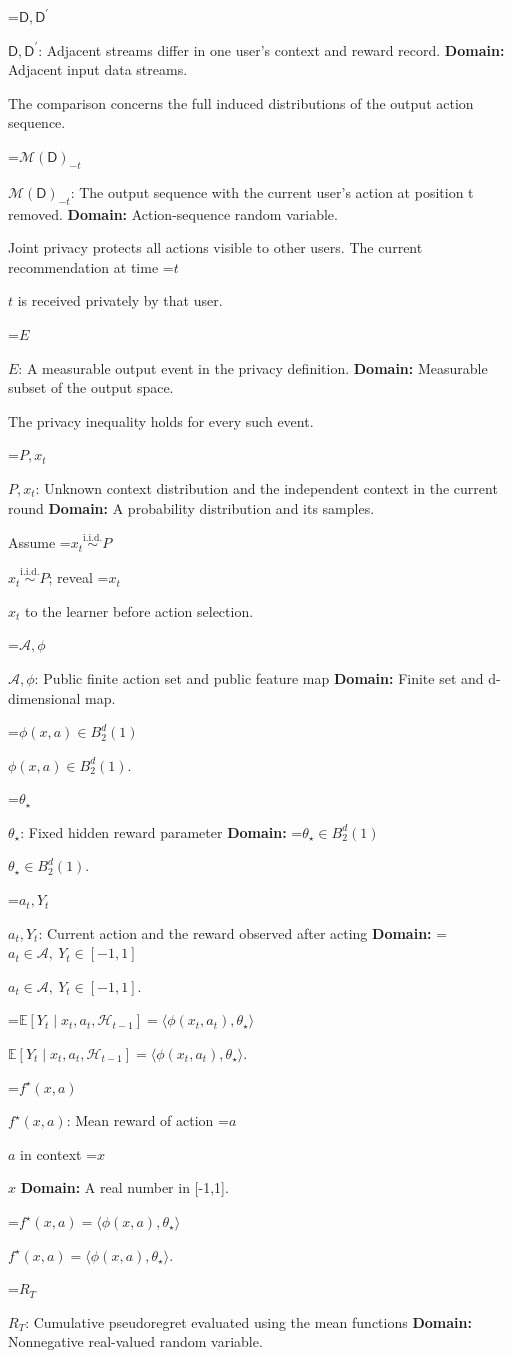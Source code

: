 \documentclass[10pt,a4paper]{article}
\newcommand{\AtlasMath}[1]{\par\begingroup\centering\setbox0=\hbox{$\displaystyle #1$}\ifdim\wd0>1.4\linewidth\typeout{ATLAS WIDE FORMULA: \the\wd0}\fi\ifdim\wd0>\linewidth\resizebox{\linewidth}{!}{\box0}\else\box0\fi\par\endgroup}
\newcommand{\AtlasInlineMath}[1]{\begingroup\setbox0=\hbox{$#1$}\ifdim\wd0>.4\linewidth\endgroup\AtlasMath{#1}\else\endgroup$#1$\fi}
\begin{document}
\AtlasInlineMath{\mathsf D,\mathsf D^{\prime}}: Adjacent streams differ in one user’s context and reward record. \textbf{Domain:} Adjacent input data streams.

The comparison concerns the full induced distributions of the output action sequence.

\AtlasInlineMath{\mathcal M(\mathsf D)_{-t}}: The output sequence with the current user’s action at position t removed. \textbf{Domain:} Action-sequence random variable.

Joint privacy protects all actions visible to other users. The current recommendation at time \AtlasInlineMath{t} is received privately by that user.

\AtlasInlineMath{E}: A measurable output event in the privacy definition. \textbf{Domain:} Measurable subset of the output space.

The privacy inequality holds for every such event.

\AtlasInlineMath{P,x_t}: Unknown context distribution and the independent context in the current round \textbf{Domain:} A probability distribution and its samples.

Assume \AtlasInlineMath{x_t\overset{\mathrm{i.i.d.}}\sim P}; reveal \AtlasInlineMath{x_t} to the learner before action selection.

\AtlasInlineMath{\mathcal A,\phi}: Public finite action set and public feature map \textbf{Domain:} Finite set and d-dimensional map.

\AtlasInlineMath{\phi(x,a)\in B_2^d(1)}.

\AtlasInlineMath{\theta_\star}: Fixed hidden reward parameter \textbf{Domain:} \AtlasInlineMath{\theta_\star\in B_2^d(1)}.

\AtlasInlineMath{a_t,Y_t}: Current action and the reward observed after acting \textbf{Domain:} \AtlasInlineMath{a_t\in\mathcal A,\ Y_t\in[-1,1]}.

\AtlasInlineMath{\mathbb E[Y_t\mid x_t,a_t,\mathcal H_{t-1}]=\langle\phi(x_t,a_t),\theta_\star\rangle}.

\AtlasInlineMath{f^\star(x,a)}: Mean reward of action \AtlasInlineMath{a} in context \AtlasInlineMath{x} \textbf{Domain:} A real number in [-1,1].

\AtlasInlineMath{f^\star(x,a)=\langle\phi(x,a),\theta_\star\rangle}.

\AtlasInlineMath{R_T}: Cumulative pseudoregret evaluated using the mean functions \textbf{Domain:} Nonnegative real-valued random variable.
\end{document}
